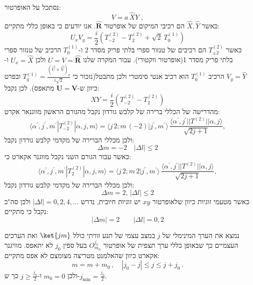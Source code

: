\documentclass{tstextbook}
\begin{document}
\begin{example}
נסתכל על האופרטור:
$$V=a\,\hat{X}\hat{Y}\;,$$
כאשר \(\hat{X},\hat{Y}\) הם רכיבי המיקום של אופרטור \(\mathbf{\hat{R}}\). אנו יודעים כי באופן כללי מתקיים:
$$U_{x}V_{y}=\frac{i}{2}(T_{-2}^{(2)}-T_{2}^{(2)}+\sqrt{2}\ T_{0}^{(1)})$$
כאשר \(T^{(2)}_{\pm 2}\) הם רכיבים של טנזור ספרי בלתי פריק מסדר 2 ו-\(T_{0}^{(1)}\) הרכיב של טנזור ספרי בלתי פריק מסדר 1(אופרטור ווקטורי).
עבור המקרה שלנו \(U=V=\mathbf{\hat{R}}\) ולכן \(U_{x}=\hat{X}\) ו-\(V_{y}=\hat{Y}\) הרכיב \(T_{0}^{(1)}\) הוא רכיב אנטי סימטרי ולכן מתבטל(נזכור כי \(T_{q}^{(1)}=\frac{\left( \vec{U}\times\vec{V} \right)_{q}}{i\sqrt{2}}\) ובפרט כיוון ש-\(\mathbf{U}=\mathbf{V}\) מתאפס). לכן נקבל:
$$XY=\frac{i}{2}(T_{-2}^{(2)}-T_{2}^{(2)})$$
מהדרישה של הכללי ברירה של קלבש גורדון נקבל מהגורם הראשון מווגנאר אקרט:
$$\langle\alpha^{\prime},j^{\prime},m^{\prime}|T_{-2}^{(2)}|\alpha,j,m\rangle=\langle j\,2;m\,(-2)|j^{\prime},m^{\prime}\rangle\,\frac{\langle\alpha^{\prime},j^{\prime}||T^{(2)}||\alpha,j\rangle}{\sqrt{2j+1}},$$
ולכן מכללי הברירה של מקדמי קלבש גורדון נקבל:
$$\Delta m = -2\quad \left\lvert  \Delta l  \right\rvert \leq 2$$
כאשר עבור הגורם השני נקבל מווגנר אקארט כי:
$$\langle\alpha^{\prime},j^{\prime},m^{\prime}|T_{2}^{(2)}|\alpha,j,m\rangle=\langle j\,2;m\,2|j^{\prime},m^{\prime}\rangle\,\frac{\langle\alpha^{\prime},j^{\prime}||T^{(2)}||\alpha,j\rangle}{\sqrt{2j+1}},$$
ולכן מכללי הברירה של מקדמי קלבש גורדון נקבל:
$$\Delta m=2,\,|\Delta l|\leq2$$
כאשר מטעמי זוגיות כיוון שלאופרטור \(xy\) יש זוגיות חיובית, נדרש \(\left\lvert  \Delta l  \right\rvert=0,2,4,\dots\)
ולכן סה"כ נקבל כי מתקיים:
$$|\Delta m|=2\qquad|\Delta l|=0,2$$

\end{example}
\begin{example}
נמצא את הערך המינימלי של \(j\) במצב עצמי של תנע זוויתי כולל \(\ket{jm}\) ואת הערכים העצמיים כך שבאופן כללי ערך תצפית של אופרטור \(O_{m_{0}}^{j_{0}}\) בעל ספין \(j_{0}\) לא יתאפס. מוויגנר אקארט כיוון שהאלמנט מטריצה מצומצם לא אפס מתקיים:
$$m=m+m_{0}\ ,\quad|j_{0}-j|\leq j\leq j+j_{0}\ .$$
ולכן \(m_{0}=0\) ו-\(j\geq \frac{j_{0}}{2}\) כך ש-\(j_{\min}=\frac{j_{0}}{2}\).

\end{example}
\end{document}
